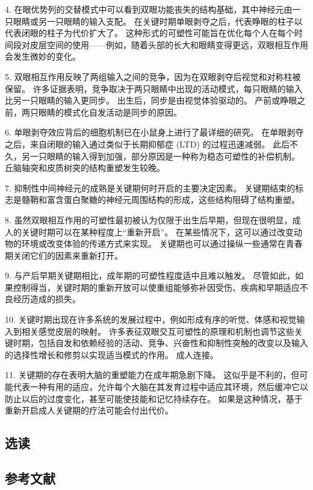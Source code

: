 4. 在眼优势列的交替模式中可以看到双眼功能丧失的结构基础，其中神经元由一只眼睛或另一只眼睛的输入支配。 在关键时期单眼剥夺之后，代表睁眼的柱子以代表闭眼的柱子为代价扩大了。 这种形式的可塑性可能旨在优化每个人在每个时间段对皮层空间的使用——例如，随着头部的长大和眼睛变得更远，双眼相互作用会发生微妙的变化。 

5. 双眼相互作用反映了两组输入之间的竞争，因为在双眼剥夺后视觉和对称柱被保留。 许多证据表明，竞争取决于两只眼睛中出现的活动模式，每只眼睛的输入比另一只眼睛的输入更同步。 出生后，同步是由视觉体验驱动的。 产前或睁眼之前，两只眼睛的模式化自发活动是同步的原因。 

6. 单眼剥夺效应背后的细胞机制已在小鼠身上进行了最详细的研究。 在单眼剥夺之后，来自闭眼的输入通过类似于长期抑郁症 (LTD) 的过程迅速减弱。 此后不久，另一只眼睛的输入得到加强，部分原因是一种称为稳态可塑性的补偿机制。 丘脑轴突和皮质树突的结构重塑发生较晚。 

7. 抑制性中间神经元的成熟是关键期何时开启的主要决定因素。 关键期结束的标志是髓鞘和富含蛋白聚糖的神经元周围结构的形成，这些结构阻碍了结构重塑。 

8. 虽然双眼相互作用的可塑性最初被认为仅限于出生后早期，但现在很明显，成人的关键时期可以在某种程度上“重新开启”。 在某些情况下，这可以通过改变动物的环境或改变体验的传递方式来实现。 关键期也可以通过操纵一些通常在青春期关闭它们的因素来重新打开。 

9. 与产后早期关键期相比，成年期的可塑性程度适中且难以触发。 尽管如此，如果控制得当，关键时期的重新开放可以使重组能够弥补因受伤、疾病和早期适应不良经历造成的损失。 

10. 关键时期出现在许多系统的发展过程中，例如形成有序的听觉、体感和视觉输入到相关感觉皮层的映射。 许多表征双眼交互可塑性的原理和机制也调节这些关键时期，包括自发和依赖经验的活动、竞争、兴奋性和抑制性突触的改变以及输入的选择性增长和修剪以实现适当模式的作用。 成人连接。

11. 关键期的存在表明大脑的重塑能力在成年期急剧下降。 这似乎是不利的，但可能代表一种有用的适应，允许每个大脑在其发育过程中适应其环境，然后缓冲它以防止以后的过度变化，甚至可能使技能和记忆持续存在。 如果是这种情况，基于重新开启成人关键期的疗法可能会付出代价。

\subsection{选读}
\subsection{参考文献}
